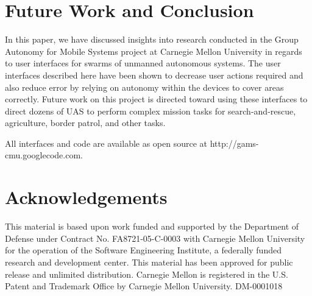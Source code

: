 \documentclass{sig-alternate-ipsn13}
\begin{document}
\section{Future Work and Conclusion}
\label{sec:conc}

In this paper, we have discussed insights into research conducted in the Group
Autonomy for Mobile Systems project at Carnegie Mellon University in regards
to user interfaces for swarms of unmanned autonomous systems. The user
interfaces described here have been shown to decrease
user actions required and also reduce error by relying on autonomy within
the devices to cover areas correctly. Future work on this project is directed toward
using these interfaces to direct dozens of UAS to perform complex mission tasks
for search-and-rescue, agriculture, border patrol, and other tasks.

All interfaces and code are available as open source at
http://gams-cmu.googlecode.com.

\section{Acknowledgements}
\label{sec:acknowledgements}

This material is based upon work funded and supported by the Department of
Defense under Contract No. FA8721-05-C-0003 with Carnegie Mellon University
for the operation of the Software Engineering Institute, a federally funded research
and development center. This material has been approved for public release and
unlimited distribution. Carnegie Mellon is registered in the U.S. Patent and
Trademark Office by Carnegie Mellon University. DM-0001018

 

\end{document}
